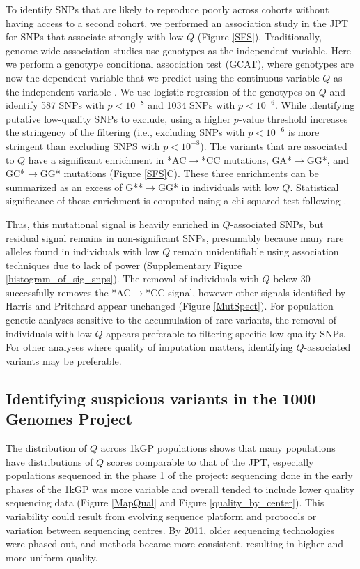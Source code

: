 \documentclass[9pt,article]{template}
\begin{document}
To identify SNPs that are likely to reproduce poorly across cohorts without having access to a second cohort, we performed an association study in the JPT for SNPs that associate strongly with low $Q$ (Figure \ref{SFS}).
Traditionally, genome wide association studies use genotypes as the independent variable. 
Here we perform a genotype conditional association test (GCAT), where genotypes are now the dependent variable that we predict using the continuous variable $Q$ as the independent variable \citep{song2015testing}.
We use logistic regression of the genotypes on $Q$ and identify 587 SNPs with $p < 10^{-8}$ and 1034 SNPs with $ p < 10^{-6}$. 
While identifying putative low-quality SNPs to exclude, using a higher $p$-value threshold increases the stringency of the filtering (i.e., excluding SNPs with $ p < 10^{-6}$ is more stringent than excluding SNPS with $p < 10^{-8}$). 
The variants that are associated to $Q$ have a significant enrichment in *AC${\rightarrow}$*CC mutations, GA*${\rightarrow}$GG*, and GC*${\rightarrow}$GG* mutations (Figure \ref{SFS}C).
These three enrichments can be summarized as an excess of G**${\rightarrow}$GG* in individuals with low $Q$.
Statistical significance of these enrichment is computed using a chi-squared test following \cite{Harris2017a}.

Thus, this mutational signal is heavily enriched in $Q$-associated SNPs, but residual signal remains in non-significant SNPs, presumably because many rare alleles found in individuals with low $Q$ remain unidentifiable using association techniques due to lack of power (Supplementary Figure \ref{histogram_of_sig_snps}).
The removal of individuals with $Q$ below 30 successfully removes the *AC${\rightarrow}$*CC signal, however other signals identified by Harris and Pritchard appear unchanged (Figure \ref{MutSpect}).
For population genetic analyses sensitive to the accumulation of rare variants, the removal of individuals with low $Q$ appears preferable to filtering specific low-quality SNPs. 
For other analyses where quality of imputation matters, identifying $Q$-associated variants may be preferable. 

\subsection{Identifying suspicious variants in the 1000 Genomes Project}
The distribution of $Q$ across 1kGP populations shows that many populations have distributions of $Q$ scores comparable to that of the JPT, especially populations sequenced in the phase 1 of the project: sequencing done in the early phases of the 1kGP was more variable and overall tended to include lower quality sequencing data (Figure \ref{MapQual} and Figure \ref{quality_by_center}).
This variability could result from evolving sequence platform and protocols or variation between sequencing centres. 
By 2011, older sequencing technologies were phased out, and methods became more consistent, resulting in higher and more uniform quality.
\end{document}
